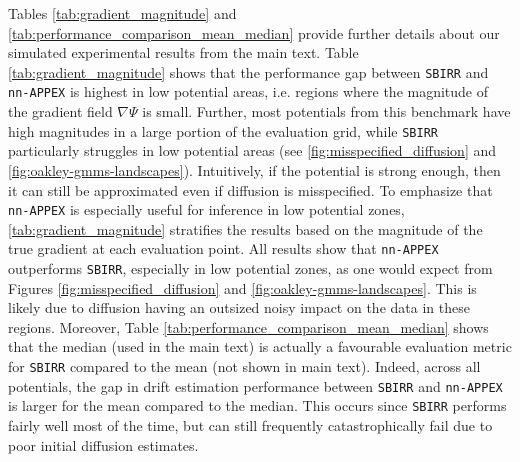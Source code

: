 \documentclass[twoside]{article}
\newcommand{\jkonetstar}{\texttt{JKOnet}$^\ast$}
\newcommand{\nappex}{\texttt{nn-APPEX}}
\newcommand{\sbirr}{\texttt{SBIRR}}
\begin{document}
Tables \ref{tab:gradient_magnitude} and \ref{tab:performance_comparison_mean_median} provide further details about our simulated experimental results from the main text. Table \ref{tab:gradient_magnitude} shows that the performance gap between \sbirr{} and \nappex{} is highest in low potential areas, i.e. regions where the magnitude of the gradient field $\nabla \Psi$ is small. Further, most potentials from this benchmark have high magnitudes in a large portion of the evaluation grid, while \sbirr{} particularly struggles in low potential areas (see \cref{fig:misspecified_diffusion} and \cref{fig:oakley-gmms-landscapes}). Intuitively, if the potential is strong enough, then it can still be approximated even if diffusion is misspecified. To emphasize that \nappex{} is especially useful for inference in low potential zones, \cref{tab:gradient_magnitude} stratifies the results based on the magnitude of the true gradient at each evaluation point. All results show that \nappex{} outperforms \sbirr, especially in low potential zones, as one would expect from Figures \ref{fig:misspecified_diffusion} and \ref{fig:oakley-gmms-landscapes}. This is likely due to diffusion having an outsized noisy impact on the data in these regions. Moreover, Table \ref{tab:performance_comparison_mean_median} shows that the median (used in the main text) is actually a favourable evaluation metric for \sbirr{} compared to the mean (not shown in main text). Indeed, across all potentials, the gap in drift estimation performance between \sbirr{} and \nappex{} is larger for the mean compared to the median. This occurs since \sbirr{} performs fairly well most of the time, but can still frequently catastrophically fail due to poor initial diffusion estimates.







\end{document}
